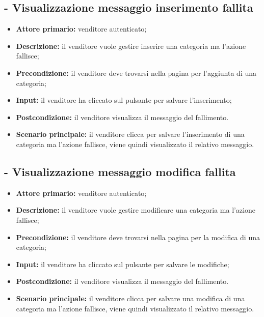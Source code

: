 \stepUserCase
\subsection{ - Visualizzazione messaggio inserimento fallita}
\begin{itemize}
    \item \textbf{Attore primario:} venditore autenticato;
    \item \textbf{Descrizione:} il venditore vuole gestire inserire una categoria ma l'azione fallisce;
    \item \textbf{Precondizione:} il venditore deve trovarsi nella pagina per l'aggiunta di una categoria;
    \item \textbf{Input:} il venditore ha cliccato sul pulsante per salvare l'inserimento;
    \item \textbf{Postcondizione:} il venditore visualizza il messaggio del fallimento.
    \item \textbf{Scenario principale:} il venditore clicca per salvare l'inserimento di una categoria ma l'azione fallisce, viene quindi visualizzato il relativo messaggio.
\end{itemize}

\stepUserCase
\subsection{ - Visualizzazione messaggio modifica fallita}
\begin{itemize}
    \item \textbf{Attore primario:} venditore autenticato;
    \item \textbf{Descrizione:} il venditore vuole gestire modificare una categoria ma l'azione fallisce;
    \item \textbf{Precondizione:} il venditore deve trovarsi nella pagina per la modifica di una categoria;
    \item \textbf{Input:} il venditore ha cliccato sul pulsante per salvare le modifiche;
    \item \textbf{Postcondizione:} il venditore visualizza il messaggio del fallimento.
    \item \textbf{Scenario principale:} il venditore clicca per salvare una modifica di una categoria ma l'azione fallisce, viene quindi visualizzato il relativo messaggio.
\end{itemize}

\stepUserCase
